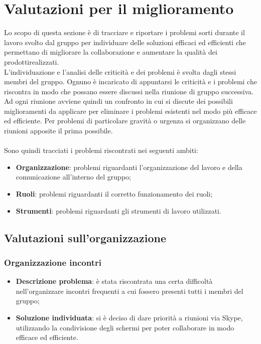 \section{Valutazioni per il miglioramento} 
Lo scopo di questa sezione è di tracciare e riportare i problemi sorti durante il lavoro svolto dal gruppo per individuare delle soluzioni efficaci ed efficienti che permettano di migliorare la collaborazione e aumentare la qualità dei prodotti\glosp realizzati.
\\L'individuazione e l'analisi delle criticità e dei problemi è svolta dagli stessi membri del gruppo. Ognuno è incaricato di appuntarsi le criticità e i problemi che riscontra in modo che possano essere discussi nella riunione di gruppo successiva. Ad ogni riunione avviene quindi un confronto in cui si discute dei possibili miglioramenti da applicare per eliminare i problemi esistenti nel modo più efficace ed efficiente. Per problemi di particolare gravità o urgenza si organizzano delle riunioni apposite il prima possibile.
\\ \\Sono quindi tracciati i problemi riscontrati nei seguenti ambiti:

\begin{itemize}
	\item \textbf{Organizzazione}: problemi riguardanti l'organizzazione del lavoro e della comunicazione all'interno del gruppo;
	\item \textbf{Ruoli}: problemi riguardanti il corretto funzionamento dei ruoli;
	\item \textbf{Strumenti}: problemi riguardanti gli strumenti di lavoro utilizzati.
\end{itemize}

\subsection{Valutazioni sull'organizzazione}
	\subsubsection{Organizzazione incontri}
		\begin{itemize}
			\item \textbf{Descrizione problema}: è stata riscontrata una certa difficoltà nell'organizzare incontri frequenti a cui fossero presenti tutti i membri del gruppo;
			\item \textbf{Soluzione individuata}: si è deciso di dare priorità a riunioni via Skype, utilizzando la condivisione degli schermi per poter collaborare in modo efficace ed efficiente.
		\end{itemize}
